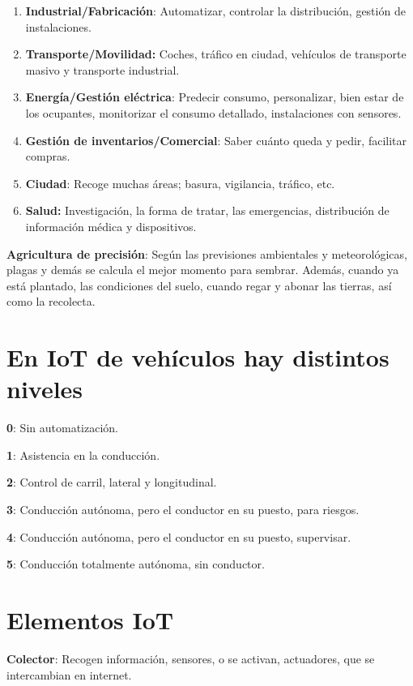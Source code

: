 \documentclass[12pt, twoside, openright]{report} %
\begin{document}
\begin{enumerate}
	\def\labelenumi{\arabic{enumi}.}
	\item \textbf{Industrial/Fabricación}: Automatizar, controlar la
	      distribución, gestión de instalaciones.
	\item \textbf{Transporte/Movilidad:} Coches, tráfico en ciudad, vehículos de
	      transporte masivo y transporte industrial.
	\item \textbf{Energía/Gestión eléctrica}: Predecir consumo, personalizar,
	      bien estar de los ocupantes, monitorizar el consumo detallado,
	      instalaciones con sensores.
	\item \textbf{Gestión de inventarios/Comercial}: Saber cuánto queda y pedir,
	      facilitar compras.
	\item \textbf{Ciudad}: Recoge muchas áreas; basura, vigilancia, tráfico,
	      etc.
	\item \textbf{Salud:} Investigación, la forma de tratar, las emergencias,
	      distribución de información médica y dispositivos.
\end{enumerate}

\textbf{Agricultura de precisión}: Según las previsiones ambientales y
meteorológicas, plagas y demás se calcula el mejor momento para sembrar.
Además, cuando ya está plantado, las condiciones del suelo, cuando regar
y abonar las tierras, así como la recolecta.

\newpage

\section{En IoT de vehículos hay distintos
  niveles}

\textbf{0}: Sin automatización.

\textbf{1}: Asistencia en la conducción.

\textbf{2}: Control de carril, lateral y longitudinal.

\textbf{3}: Conducción autónoma, pero el conductor en su puesto, para
riesgos.

\textbf{4}: Conducción autónoma, pero el conductor en su puesto,
supervisar.

\textbf{5}: Conducción totalmente autónoma, sin conductor.

\section{Elementos IoT}

\textbf{Colector}: Recogen información, sensores, o se activan,
actuadores, que se intercambian en internet.
\end{document}

